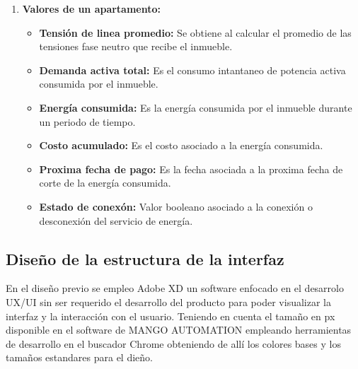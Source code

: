 \begin{enumerate}
        \item \textbf{Valores de un apartamento:}
        
        \begin{itemize}
            \item \textbf{Tensión de linea promedio:} Se obtiene al calcular el promedio de las tensiones fase neutro que recibe el inmueble.
            \item \textbf{Demanda activa total:} Es el consumo intantaneo de potencia activa consumida por el inmueble.
            \item \textbf{Energía consumida:} Es la energía consumida por el inmueble durante un periodo de tiempo.
            \item \textbf{Costo acumulado:} Es el costo asociado a la energía consumida.
            \item \textbf{Proxima fecha de pago:} Es la fecha asociada a la proxima fecha de corte de la energía consumida.
            \item \textbf{Estado de conexón:} Valor booleano asociado a la conexión o desconexión del servicio de energía.
        \end{itemize}
    \end{enumerate}
\subsection{Diseño de la estructura de la interfaz}

    En el diseño previo se empleo Adobe XD un software enfocado en el desarrolo UX/UI sin ser requerido el desarrollo del producto para
    poder visualizar la interfaz y la interacción con el usuario. Teniendo en cuenta el tamaño en px disponible en el software de MANGO AUTOMATION
    empleando herramientas de desarrollo en el buscador Chrome obteniendo de allí los colores bases y los tamaños estandares para el dieño.

\newpage